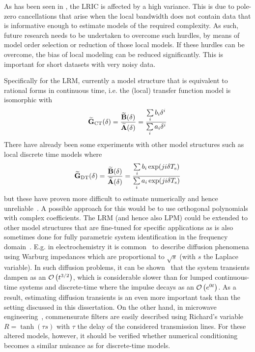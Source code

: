     As has been seen in , the \gls{LRIC} is affected by a high variance.
    This is due to pole-zero cancellations that arise when the local bandwidth does not contain data that is informative enough to estimate models of the required complexity.
    As such, future research needs to be undertaken to overcome such hurdles, by means of model order selection or reduction of those local models.
    If these hurdles can be overcome, the bias of local modeling can be reduced significantly.
    This is important for short datasets with very noisy data.

    Specifically for the \gls{LRM}, currently a model structure that is equivalent to rational forms in continuous time, i.e. the (local) transfer function model is isomorphic with
    \begin{equation}
      \LocalModel[\CT]{G}(\dW) 
      = \frac{\LocalModel{B}(\dW)}{\LocalModel{A}(\dW)}
      = \frac{\Sum_i  b_i \dW^{i}}{\Sum_i  a_i \dW^{i}}
    \end{equation}
    There have already been some experiments with other model structures such as local discrete time models where
    \begin{equation}
      \LocalModel[\DT]{G}(\dW) 
      = \frac{\LocalModel{B}(\dW)}{\LocalModel{A}(\dW)}
      = \frac{\Sum_i  b_i \exp (ji\dW\Ts)}{\Sum_i  a_i \exp (ji\dW\Ts) }
    \end{equation}
    but these have proven more difficult to estimate numerically and hence unreliable~\citep[Section 2.4]{Pintelon2006BJ1}.
    A possible approach for this would be to use orthogonal polynomials~\citep{Forsythe1957,Bultheel2005} with complex coefficients.
    The \gls{LRM} (and hence also \gls{LPM}) could be extended to other model structures that are fine-tuned for specific applications as is also sometimes done for fully parametric system identification in the frequency domain~\citep[p. 179]{Pintelon2012}.
    E.g. in electrochemistry it is common~\citep{Wang1987} to describe diffusion phenomena using Warburg impedances which are proportional to $\sqrt{s}$ (with $s$ the Laplace variable).
    In such diffusion problems, it can be shown~\citep[p. 181]{Pintelon2012} that the system transients dampen as an $\mathcal{O} \left( t^{3/2} \right)$, which is considerable slower than for lumped continuous-time systems and discrete-time where the impulse decays as an $\mathcal{O} \left( e^{0t} \right)$.
As a result, estimating diffusion transients is an even more important task than the setting discussed in this dissertation.
    On the other hand, in microwave engineering~\citep{Rizzi1988,Pozar2005}, commensurate filters are easily described using Richard's variable $R=\tanh (\tau s)$ with $\tau$ the delay of the considered transmission lines.
    For these altered models, however, it should be verified whether numerical conditioning becomes a similar nuisance as for discrete-time models.

